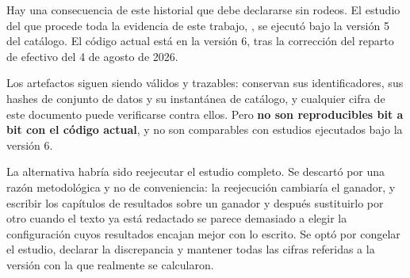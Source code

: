 Hay una consecuencia de este historial que debe declararse sin rodeos. El estudio del que procede
toda la evidencia de este trabajo, \studyid, se ejecutó bajo la versión 5 del catálogo. El código
actual está en la versión 6, tras la corrección del reparto de efectivo del 4 de agosto de 2026.

Los artefactos siguen siendo válidos y trazables: conservan sus identificadores, sus hashes de
conjunto de datos y su instantánea de catálogo, y cualquier cifra de este documento puede
verificarse contra ellos. Pero \textbf{no son reproducibles bit a bit con el código actual}, y no
son comparables con estudios ejecutados bajo la versión 6.

La alternativa habría sido reejecutar el estudio completo. Se descartó por una razón metodológica y
no de conveniencia: la reejecución cambiaría el ganador, y escribir los capítulos de resultados
sobre un ganador y después sustituirlo por otro cuando el texto ya está redactado se parece
demasiado a elegir la configuración cuyos resultados encajan mejor con lo escrito. Se optó por
congelar el estudio, declarar la discrepancia y mantener todas las cifras referidas a la versión con
la que realmente se calcularon.
